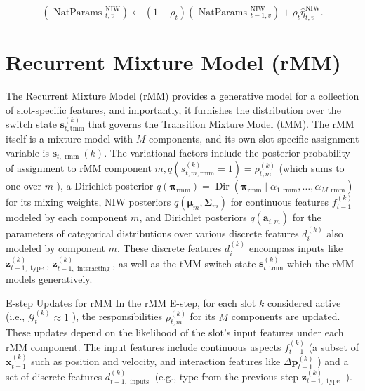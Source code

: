 \documentclass[10pt]{article}
\begin{document}
\begin{equation*}
\left(\text { NatParams }_{t, v}^{\mathrm{NIW}}\right) \leftarrow\left(1-\rho_{t}\right)\left(\text { NatParams }_{t-1, v}^{\mathrm{NIW}}\right)+\rho_{t} \hat{\eta}_{t, v}^{\mathrm{NIW}} . \tag{51}
\end{equation*}


\section*{Recurrent Mixture Model (rMM)}
The Recurrent Mixture Model (rMM) provides a generative model for a collection of slot-specific features, and importantly, it furnishes the distribution over the switch state $\mathbf{s}_{t, \mathrm{tmm}}^{(k)}$ that governs the Transition Mixture Model (tMM). The rMM itself is a mixture model with $M$ components, and its own slot-specific assignment variable is $\mathbf{s}_{t, \text { rmm }}(k)$. The variational factors include the posterior probability of assignment to rMM component $m, q\left(s_{t, m, \mathrm{rmm}}^{(k)}=1\right)=\rho_{t, m}^{(k)}$ (which sums to one over $m$ ), a Dirichlet posterior $q\left(\boldsymbol{\pi}_{\mathrm{rmm}}\right)=\operatorname{Dir}\left(\boldsymbol{\pi}_{\mathrm{rmm}} \mid \alpha_{1, \mathrm{rmm}}, \ldots, \alpha_{M, \mathrm{rmm}}\right)$ for its mixing weights, NIW posteriors $q\left(\boldsymbol{\mu}_{m}, \boldsymbol{\Sigma}_{m}\right)$ for continuous features $f_{t-1}^{(k)}$ modeled by each component $m$, and Dirichlet posteriors $q\left(\mathbf{a}_{i, m}\right)$ for the parameters of categorical distributions over various discrete features $d_{i}^{(k)}$ also modeled by component $m$. These discrete features $d_{i}^{(k)}$ encompass inputs like $\mathbf{z}_{t-1, \text { type }}^{(k)}$, $\mathbf{z}_{t-1, \text { interacting }}^{(k)}$, as well as the tMM switch state $\mathbf{s}_{t, \mathrm{tmm}}^{(k)}$ which the rMM models generatively.

E-step Updates for rMM In the rMM E-step, for each slot $k$ considered active (i.e., $\mathcal{G}_{t}^{(k)} \approx 1$ ), the responsibilities $\rho_{t, m}^{(k)}$ for its $M$ components are updated. These updates depend on the likelihood of the slot's input features under each rMM component. The input features include continuous aspects $f_{t-1}^{(k)}$ (a subset of $\mathbf{x}_{t-1}^{(k)}$ such as position and velocity, and interaction features like $\Delta \mathbf{p}_{t-1}^{(k)}$ ) and a set of discrete features $d_{t-1, \text { inputs }}^{(k)}$ (e.g., type from the previous step $\mathbf{z}_{t-1, \text { type }}^{(k)}$ ).
\end{document}
